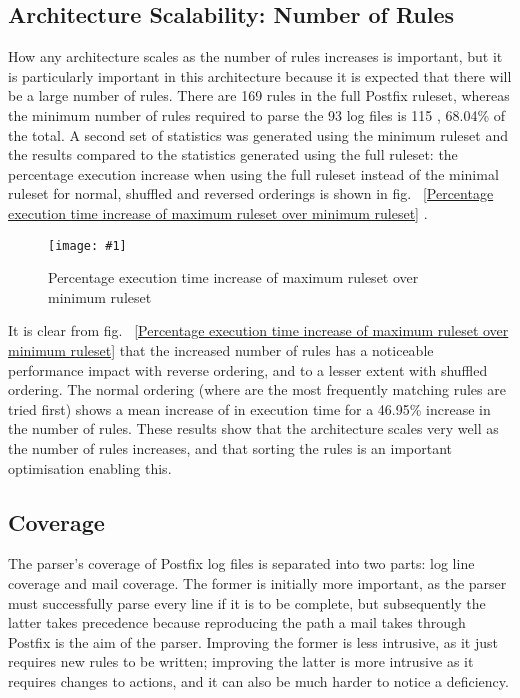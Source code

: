 \documentclass[draft]{svmult}
\newcommand{\showgraph}[3]{%
    \begin{figure}[hbt!]%
        \caption{#2}\label{#3}%
        \texttt{[image: \#1]}%
    \end{figure}%
}
\newcommand{\refwithpage}[1]{%
    \empty{}\vref{#1}%
}
\newcommand{\numberOFlogFILES}[0]{%
    93%
}
\newcommand{\numberOFrules}[0]{%
    169%
}
\newcommand{\numberOFrulesMINIMUM}[0]{%
    115%
}
\newcommand{\numberOFrulesMINIMUMpercentage}[0]{%
    68.04\%%
}
\newcommand{\numberOFrulesMAXIMUMpercentage}[0]{%
    46.95\%%
}
\begin{document}
\subsection{Architecture Scalability: Number of Rules}

How any architecture scales as the number of rules increases is important,
but it is particularly important in this architecture because it is
expected that there will be a large number of rules.  There are
\numberOFrules{} rules in the full Postfix ruleset, whereas the minimum
number of rules required to parse the \numberOFlogFILES{} log files is
\numberOFrulesMINIMUM{}, \numberOFrulesMINIMUMpercentage{} of the total.  A
second set of statistics was generated using the minimum ruleset and the
results compared to the statistics generated using the full ruleset: the
percentage execution increase when using the full ruleset instead of the
minimal ruleset for normal, shuffled and reversed orderings is shown in
fig.~\refwithpage{Percentage execution time increase of maximum ruleset
over minimum ruleset}.  \showgraph{build/plot-normal-vs-smaller}{Percentage
execution time increase of maximum ruleset over minimum ruleset}{Percentage
execution time increase of maximum ruleset over minimum ruleset}

It is clear from fig.~\refwithpage{Percentage execution time increase of
maximum ruleset over minimum ruleset} that the increased number of rules
has a noticeable performance impact with reverse ordering, and to a lesser
extent with shuffled ordering.  The normal ordering (where are the most
frequently matching rules are tried first) shows a mean increase of 
 in
execution time for a \numberOFrulesMAXIMUMpercentage{} increase in the
number of rules.  These results show that the architecture scales very well
as the number of rules increases, and that sorting the rules is an
important optimisation enabling this.

\subsection{Coverage}

\label{coverage}

The parser's coverage of Postfix log files is separated into two parts: log
line coverage and mail coverage.  The former is initially more important,
as the parser must successfully parse every line if it is to be complete,
but subsequently the latter takes precedence because reproducing the path a
mail takes through Postfix is the aim of the parser.  Improving the former
is less intrusive, as it just requires new rules to be written; improving
the latter is more intrusive as it requires changes to actions, and it can
also be much harder to notice a deficiency.
\end{document}
